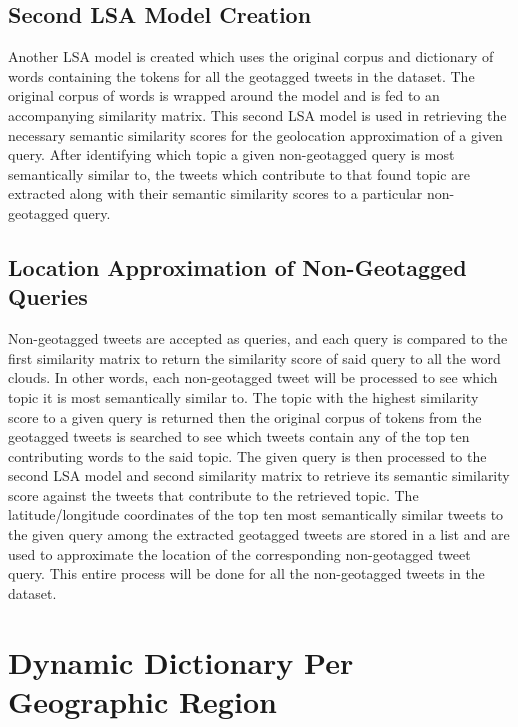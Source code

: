 \subsection{Second LSA Model Creation}

Another LSA model is created which uses the original corpus and dictionary of words containing the tokens for all the geotagged tweets in the dataset. The original corpus of words is wrapped around the model and is fed to an accompanying similarity matrix. This second LSA model is used in retrieving the necessary semantic similarity scores for the geolocation approximation of a given query. After identifying which topic a given non-geotagged query is most semantically similar to, the tweets which contribute to that found topic are extracted along with their semantic similarity scores to a particular non-geotagged query.

\subsection{Location Approximation of Non-Geotagged Queries}

Non-geotagged tweets are accepted as queries, and each query is compared to the first similarity matrix to return the similarity score of said query to all the word clouds. In other words, each non-geotagged tweet will be processed to see which topic it is most semantically similar to. The topic with the highest similarity score to a given query is returned then the original corpus of tokens from the geotagged tweets is searched to see which tweets contain any of the top ten contributing words to the said topic. The given query is then processed to the second LSA model and second similarity matrix to retrieve its semantic similarity score against the tweets that contribute to the retrieved topic. The latitude/longitude coordinates of the top ten most semantically similar tweets to the given query among the extracted geotagged tweets are stored in a list and are used to approximate the location of the corresponding non-geotagged tweet query. This entire process will be done for all the non-geotagged tweets in the dataset. 

\section{Dynamic Dictionary Per Geographic Region}

